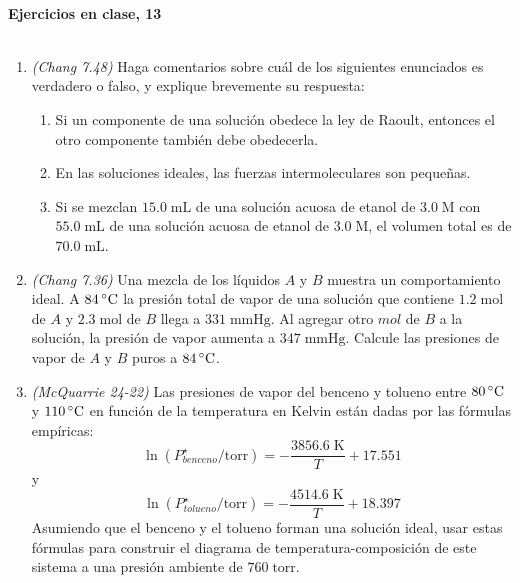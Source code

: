 \documentclass[a4paper,12pt]{article}
\begin{document}

\begin{center}
\HRule \\[0.4cm]
{ \bfseries Ejercicios en clase, 13}\\ %
\HRule \\[0.4cm]
\end{center}


\begin{enumerate}

 \item \textit{(Chang 7.48)} Haga comentarios sobre cu\'al de los siguientes enunciados es verdadero o falso, y explique brevemente su respuesta:
\begin{enumerate}
 \item Si un componente de una soluci\'on obedece la ley de Raoult, entonces el otro componente tambi\'en debe obedecerla.
 \item En las soluciones ideales, las fuerzas intermoleculares son peque\~nas.
 \item Si se mezclan $15.0\;\mbox{mL}$ de una soluci\'on acuosa de etanol de $3.0\;\mbox{M}$ con $55.0\;\mbox{mL}$ de una soluci\'on acuosa de etanol de $3.0\;\mbox{M}$, el volumen total es de $70.0\;\mbox{mL}$.
\end{enumerate} %

 \item \textit{(Chang 7.36)} Una mezcla de los l\'iquidos $A$ y $B$ muestra un comportamiento ideal. A $84\,\celsius$ la presi\'on total de vapor de una soluci\'on que contiene $1.2\;\mbox{mol}$ de $A$ y $2.3\;\mbox{mol}$ de $B$ llega a $331\;\mbox{mmHg}$. Al agregar otro $mol$ de $B$ a la soluci\'on, la presi\'on de vapor aumenta a $347\;\mbox{mmHg}$. Calcule las presiones de vapor de $A$ y $B$ puros a $84\,\celsius$. %

 \item \textit{(McQuarrie 24-22)} Las presiones de vapor del benceno y tolueno entre $80\,\celsius$ y $110\,\celsius$ en funci\'on de la temperatura en Kelvin est\'an dadas por las f\'ormulas emp\'iricas:
$$\ln(P_{benceno}^\star/\mbox{torr})=-\frac{3856.6\;\mbox{K}}{T}+17.551$$
y
$$\ln(P_{tolueno}^\star/\mbox{torr})=-\frac{4514.6\;\mbox{K}}{T}+18.397$$
Asumiendo que el benceno y el tolueno forman una soluci\'on ideal, usar estas f\'ormulas para construir el diagrama de temperatura-composici\'on de este sistema a una presi\'on ambiente de $760\;\mbox{torr}$. %


\end{enumerate}
\end{document}
